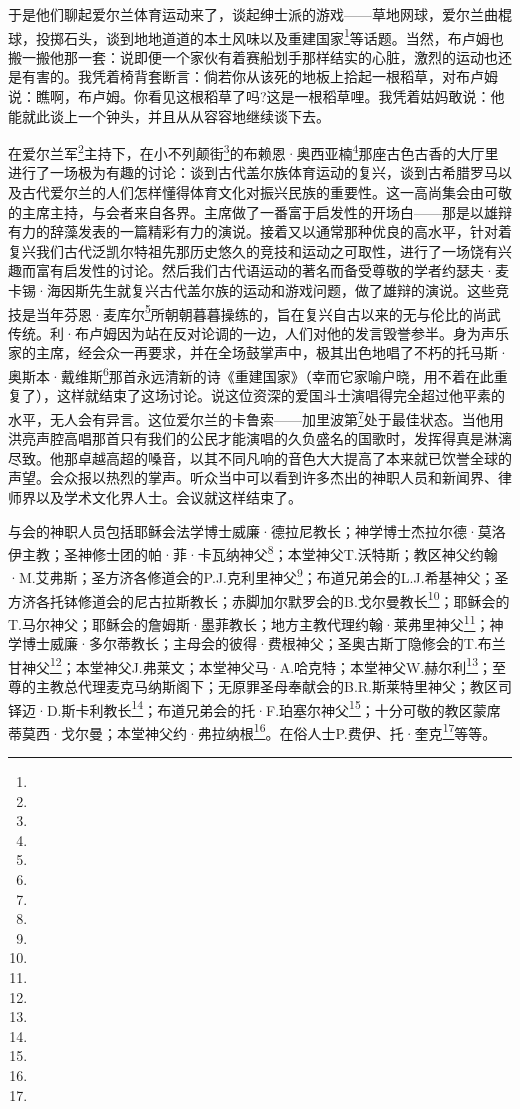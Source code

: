 \par 于是他们聊起爱尔兰体育运动来了，谈起绅士派的游戏——草地网球，爱尔兰曲棍球，投掷石头，谈到地地道道的本土风味以及重建国家\footnote{}等话题。当然，布卢姆也搬一搬他那一套：说即便一个家伙有着赛船划手那样结实的心脏，激烈的运动也还是有害的。我凭着椅背套断言：倘若你从该死的地板上拾起一根稻草，对布卢姆说：瞧啊，布卢姆。你看见这根稻草了吗?这是一根稻草哩。我凭着姑妈敢说：他能就此谈上一个钟头，并且从从容容地继续谈下去。
\par 在爱尔兰军\footnote{}主持下，在小不列颠街\footnote{}的布赖恩·奥西亚楠\footnote{}那座古色古香的大厅里进行了一场极为有趣的讨论：谈到古代盖尔族体育运动的复兴，谈到古希腊罗马以及古代爱尔兰的人们怎样懂得体育文化对振兴民族的重要性。这一高尚集会由可敬的主席主持，与会者来自各界。主席做了一番富于启发性的开场白——那是以雄辩有力的辞藻发表的一篇精彩有力的演说。接着又以通常那种优良的高水平，针对着复兴我们古代泛凯尔特祖先那历史悠久的竞技和运动之可取性，进行了一场饶有兴趣而富有启发性的讨论。然后我们古代语运动的著名而备受尊敬的学者约瑟夫·麦卡锡·海因斯先生就复兴古代盖尔族的运动和游戏问题，做了雄辩的演说。这些竞技是当年芬恩·麦库尔\footnote{}所朝朝暮暮操练的，旨在复兴自古以来的无与伦比的尚武传统。利·布卢姆因为站在反对论调的一边，人们对他的发言毁誉参半。身为声乐家的主席，经会众一再要求，并在全场鼓掌声中，极其出色地唱了不朽的托马斯·奥斯本·戴维斯\footnote{}那首永远清新的诗《重建国家》（幸而它家喻户晓，用不着在此重复了），这样就结束了这场讨论。说这位资深的爱国斗士演唱得完全超过他平素的水平，无人会有异言。这位爱尔兰的卡鲁索——加里波第\footnote{}处于最佳状态。当他用洪亮声腔高唱那首只有我们的公民才能演唱的久负盛名的国歌时，发挥得真是淋漓尽致。他那卓越高超的嗓音，以其不同凡响的音色大大提高了本来就已饮誉全球的声望。会众报以热烈的掌声。听众当中可以看到许多杰出的神职人员和新闻界、律师界以及学术文化界人士。会议就这样结束了。
\par 与会的神职人员包括耶稣会法学博士威廉·德拉尼教长；神学博士杰拉尔德·莫洛伊主教；圣神修士团的帕·菲·卡瓦纳神父\footnote{}；本堂神父T.沃特斯；教区神父约翰·M.艾弗斯；圣方济各修道会的P.J.克利里神父\footnote{}；布道兄弟会的L.J.希基神父；圣方济各托钵修道会的尼古拉斯教长；赤脚加尔默罗会的B.戈尔曼教长\footnote{}；耶稣会的T.马尔神父；耶稣会的詹姆斯·墨菲教长；地方主教代理约翰·莱弗里神父\footnote{}；神学博士威廉·多尔蒂教长；主母会的彼得·费根神父；圣奥古斯丁隐修会的T.布兰甘神父\footnote{}；本堂神父J.弗莱文；本堂神父马·A.哈克特；本堂神父W.赫尔利\footnote{}；至尊的主教总代理麦克马纳斯阁下；无原罪圣母奉献会的B.R.斯莱特里神父；教区司铎迈·D.斯卡利教长\footnote{}；布道兄弟会的托·F.珀塞尔神父\footnote{}；十分可敬的教区蒙席蒂莫西·戈尔曼；本堂神父约·弗拉纳根\footnote{}。在俗人士P.费伊、托·奎克\footnote{}等等。
